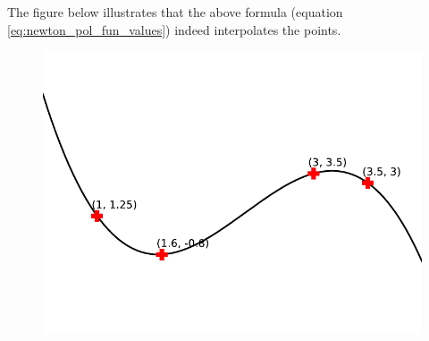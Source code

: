 \begin{tcolorbox}[enhanced, size=fbox, shadow={2mm}{-2mm}{0mm}{gray!30!white}, boxrule={1.5pt}, colback=white, sharp corners, breakable, boxsep=5pt, left=2pt, right=2pt, title=\Large{Newton Polynomials}]
    The figure below illustrates that the above formula (equation \ref{eq:newton_pol_fun_values}) indeed interpolates the points.
    \begin{figure}[H]
        \vspace{-2em}
        \centering
        \includegraphics[width=.5\textwidth]{pictures/newton_polynomial}
        \vspace{-1em}
    \end{figure}

\end{tcolorbox}

